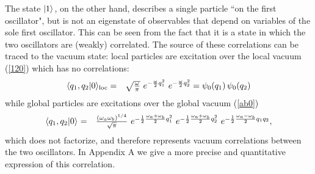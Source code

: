 \documentclass[10pt, nofootinbib]{revtex4}
\newcommand{\bea}{\begin{eqnarray}}
\newcommand{\eea}{\end{eqnarray}}
\begin{document}
The state $|1\rangle_{\rm }$, on the other hand, describes a single
particle ``on the first oscillator", but is not an eigenstate of
observables that depend on variables of the sole first oscillator. 
This can be seen from the fact that it is a state in which the two
oscillators are (weakly) correlated. The source of these
correlations can be traced to the vacuum state: local particles are
excitation over the local vacuum (\ref{120}) which has no
correlations:
%
\bea 
\langle q_{1},q_{2}|0\rangle_{\rm loc} &=& 
{\textstyle{\sqrt{\frac{\omega}{\pi}}}}
\ e^{ -\frac{\omega}{2}q_1^2 } 
\ e^{ -\frac{\omega}{2}q_2^2 } = \psi_{0}(q_{1})\,  \psi_{0}(q_{2})
\label{0loc}
\eea
%
while global  particles are excitations over the 
global vacuum (\ref{ab0})
%
\bea
\langle q_{1},q_{2}|0\rangle_{\rm } &=& 
\textstyle{\frac{(\omega_a \omega_b)^{1/4}}{\sqrt{\pi}} }
\ e^{-\frac{1}{2}\frac{\omega_{a}+\omega_{b}}{2}q_{1}^2}
\ e^{-\frac{1}{2}\frac{\omega_{a}+\omega_{b}}{2}q_{2}^2}
\ e^{-\frac{1}{2}
\frac{\omega_{a}-\omega_{b}}{2} q_{1}q_{2}},
\label{0glo}
\eea
%
which does not factorize, and therefore represents vacuum correlations
between the two oscillators.  In Appendix A we give a more precise and
quantitative expression of this correlation.
\end{document}
